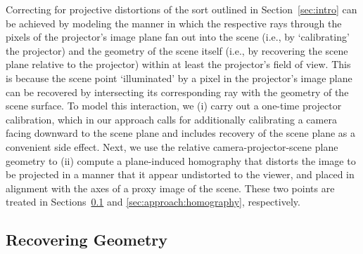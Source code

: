 \documentclass[review]{elsarticle}
\begin{document}
Correcting for projective distortions of the sort outlined in Section~\ref{sec:intro} can be achieved by modeling the manner in which the respective rays through the pixels of the projector's image plane fan out into the scene (i.e., by `calibrating' the projector) and the geometry of the scene itself (i.e., by recovering the scene plane relative to the projector) within at least the projector's field of view. This is because the scene point `illuminated' by a pixel in the projector's image plane can be recovered by intersecting its corresponding ray with the geometry of the scene surface. To model this interaction, we (i) carry out a one-time projector calibration, which in our approach calls for additionally calibrating a camera facing downward to the scene plane and includes recovery of the scene plane as a convenient side effect. Next, we use the relative camera-projector-scene plane geometry to (ii) compute a plane-induced homography that distorts the image to be projected in a manner that it appear undistorted to the viewer, and placed in alignment with the axes of a proxy image of the scene. These two points are treated in Sections~\ref{sec:approach:geometry} and \ref{sec:approach:homography}, respectively.

\subsection{Recovering Geometry}\label{sec:approach:geometry}
\end{document}
